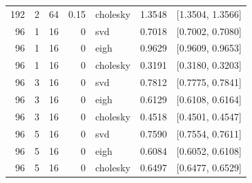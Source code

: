 \begin{tabular}{rrrrlrr}
192 & 2 & 64 & 0.15 & cholesky & 1.3548 & [1.3504, 1.3566] \\
96 & 1 & 16 & 0 & svd & 0.7018 & [0.7002, 0.7080] \\
96 & 1 & 16 & 0 & eigh & 0.9629 & [0.9609, 0.9653] \\
96 & 1 & 16 & 0 & cholesky & 0.3191 & [0.3180, 0.3203] \\
96 & 3 & 16 & 0 & svd & 0.7812 & [0.7775, 0.7841] \\
96 & 3 & 16 & 0 & eigh & 0.6129 & [0.6108, 0.6164] \\
96 & 3 & 16 & 0 & cholesky & 0.4518 & [0.4501, 0.4547] \\
96 & 5 & 16 & 0 & svd & 0.7590 & [0.7554, 0.7611] \\
96 & 5 & 16 & 0 & eigh & 0.6084 & [0.6052, 0.6108] \\
96 & 5 & 16 & 0 & cholesky & 0.6497 & [0.6477, 0.6529] \\
\hline
\end{tabular}
